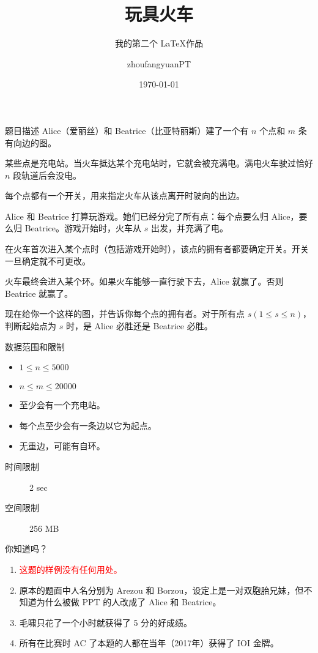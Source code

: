 \documentclass{ctexbeamer}
\title{玩具火车}
\subtitle{我的第二个 \LaTeX 作品}
\author{zhoufangyuanPT}
\date{\today}
\begin{document}
	\begin{frame}
		\titlepage
	\end{frame}

	\begin{frame}{题目描述}
		Alice（爱丽丝）和 Beatrice（比亚特丽斯）建了一个有 $n$ 个点和 $m$ 条有向边的图。

		某些点是充电站。当火车抵达某个充电站时，它就会被充满电。满电火车驶过恰好 $n$ 段轨道后会没电。

		每个点都有一个开关，用来指定火车从该点离开时驶向的出边。

		Alice 和 Beatrice 打算玩游戏。她们已经分完了所有点：每个点要么归 Alice，要么归 Beatrice。游戏开始时，火车从 $s$ 出发，并充满了电。

		在火车首次进入某个点时（包括游戏开始时），该点的拥有者都要确定开关。开关一旦确定就不可更改。

		火车最终会进入某个环。如果火车能够一直行驶下去，Alice 就赢了。否则 Beatrice 就赢了。

		现在给你一个这样的图，并告诉你每个点的拥有者。对于所有点 $s(1\leq s\leq n)$，判断起始点为 $s$ 时，是 Alice 必胜还是 Beatrice 必胜。
	\end{frame}

	\begin{frame}{数据范围和限制}
		\begin{itemize}
			\item $1\leq n\leq 5000$

			\item $n\leq m\leq 20000$

			\item 至少会有一个充电站。

			\item 每个点至少会有一条边以它为起点。

			\item 无重边，可能有自环。
		\end{itemize}

		\begin{description}
			\item[时间限制] 2 sec

			\item[空间限制] 256 MB
		\end{description}
	\end{frame}

	\begin{frame}[t]{你知道吗？}
		\begin{enumerate}
			\item \textcolor{red}{这题的样例没有任何用处。}

			\item 原本的题面中人名分别为 Arezou 和 Borzou，设定上是一对双胞胎兄妹，但不知道为什么被做 PPT 的人改成了 Alice 和 Beatrice。

			\item 毛啸只花了一个小时就获得了 5 分的好成绩。

			\item 所有在比赛时 AC 了本题的人都在当年（2017年）获得了 IOI 金牌。
		\end{enumerate}
	\end{frame}
\end{document}
